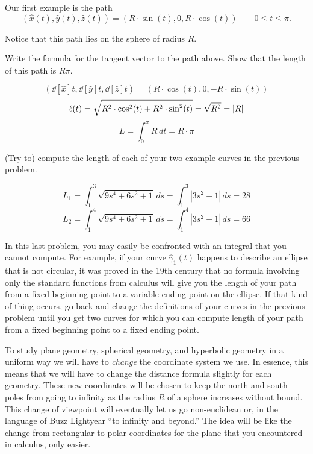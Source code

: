 \documentclass[newpage,hints,handout]{ximera}
\begin{document}
Our first example is the path%
\[
\left(\hat{x}(t),\hat{y}(t),\hat{z}(t)\right)=\left(R\cdot\sin(t),0,R\cdot\cos(t)\right) \qquad
0 \leq t\leq\pi.
\]


Notice that this path lies on the sphere of radius $R$.

\begin{problem}
  Write the formula for the tangent vector to the path above. Show that the
  length of this path is $R\pi$.

\begin{freeResponse}
\[
\left( \dd[\hat{x}]{t}, \dd[\hat{y}]{t}, \dd[\hat{z}]{t} \right) 
    = \left(R\cdot\cos(t),0,-R\cdot\sin(t) \right)
\]
\[
\ell(t) = \sqrt{
   R^2 \cdot\cos^{2}(t) + R^2 \cdot\sin^{2}(t)} 
   = \sqrt{R^2} = |R|
\]
\[
L=\int_{0}^{\pi} R \,dt = R\cdot\pi
\]
\end{freeResponse}

\end{problem}

\begin{problem}
(Try to) compute the length of each of your two example curves in the previous
problem.

\begin{freeResponse}
\[
L_{1}= \int_{1}^{3}  \sqrt{9s^4 + 6s^2 +1} \,ds = \int_{1}^{3} |3s^2 +1| \, ds = 28
\]
\[
L_{2}= \int_{1}^{4}  \sqrt{9s^4 + 6s^2 +1} \,ds = \int_{1}^{4} |3s^2 +1| \, ds = 66
\]
\end{freeResponse}

\end{problem}

\begin{remark}
  In this last problem, you may easily be confronted with an integral that you
  cannot compute. For example, if your curve $\hat{\gamma}_{1}(t)$ happens to
  describe an ellipse that is not circular, it was proved in the 19th century
  that no formula involving only the standard functions from calculus will give
  you the length of your path from a fixed beginning point to a variable ending
  point on the ellipse. If that kind of thing occurs, go back and change the
  definitions of your curves in the previous problem until you get two
  curves for which you can compute length of your path from a fixed
  beginning point to a fixed ending point. %
\end{remark}





To study plane geometry, spherical geometry, and hyperbolic geometry in a
uniform way we will have to \textit{change} the coordinate system we use. In
essence, this means that we will have to change the distance formula slightly
for each geometry. These new coordinates will be chosen to keep the north and
south poles from going to infinity as the radius $R$ of a sphere increases
without bound. This change of viewpoint will eventually let us go non-euclidean
or, in the language of Buzz Lightyear ``to infinity and beyond.'' The idea will
be like the change from rectangular to polar coordinates for the plane that you
encountered in calculus, only easier.
\end{document}
